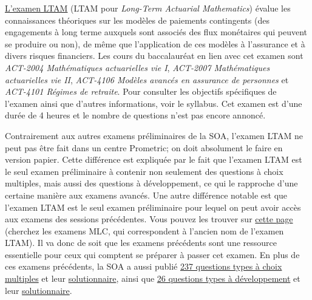 \href{https://www.soa.org/Education/Exam-Req/edu-exam-ltam-detail.aspx}{L'examen LTAM} (LTAM pour \textit{Long-Term Actuarial Mathematics}) évalue les connaissances théoriques sur les modèles de paiements contingents (des engagements à long terme auxquels sont associés des flux monétaires qui peuvent se produire ou non), de même que l'application de ces modèles à l'assurance et à divers risques financiers.  Les cours du baccalauréat en lien avec cet examen sont \textit{ACT-2004 Mathématiques actuarielles vie I}, \textit{ACT-2007 Mathématiques actuarielles vie II}, \textit{ACT-4106 Modèles avancés en assurance de personnes} et \textit{ACT-4101 Régimes de retraite}. Pour consulter les objectifs spécifiques de l'examen ainsi que d'autres informations, voir le syllabus. Cet examen est d'une durée de 4 heures et le nombre de questions n'est pas encore annoncé. \vspace{\baselineskip}

Contrairement aux autres examens préliminaires de la SOA, l'examen LTAM ne peut pas être fait dans un centre Prometric; on doit absolument le faire en version papier. Cette différence est expliquée par le fait que l'examen LTAM est le seul examen préliminaire à contenir non seulement des questions à choix multiples, mais aussi des questions à développement, ce qui le rapproche d'une certaine manière aux examens avancés. Une autre différence notable est que l'examen LTAM est le seul examen préliminaire pour lequel on peut avoir accès aux examens des sessions précédentes. Vous pouvez les trouver sur \href{https://www.soa.org/education/exam-req/syllabus-study-materials/edu-multiple-choice-exam.aspx}{cette page} (cherchez les examens MLC, qui correspondent à l'ancien nom de l'examen LTAM). Il va donc de soit que les examens précédents sont une ressource essentielle pour ceux qui comptent se préparer à passer cet examen. En plus de ces examens précédents, la SOA a aussi publié \href{https://www.soa.org/Files/Edu/2018/edu-spring-ltam-ques.pdf}{237 questions types à choix multiples} et leur \href{https://www.soa.org/Files/Edu/2018/edu-spring-ltam-sol.pdf}{solutionnaire}, ainsi que \href{https://www.soa.org/Files/Edu/2018/edu-spring-ltam-wa-ques.pdf}{26 questions types à développement} et leur \href{https://www.soa.org/Files/Edu/2018/edu-spring-ltam-wa-sol.pdf}{solutionnaire}. \vspace{\baselineskip}

